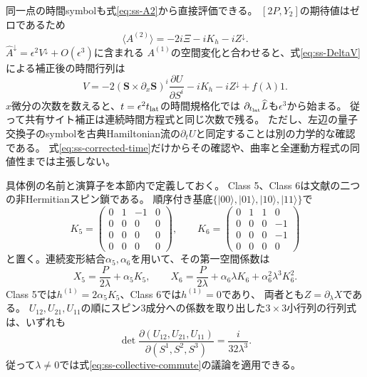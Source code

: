 同一点の時間symbolも式\eqref{eq:ss-A2}から直接評価できる。
$[2P,Y_2]$の期待値はゼロであるため
\begin{equation}
\langle A^{(2)}\rangle=-2i\Xi-iK_h-iZ^\downarrow.
\label{eq:ss-A2-symbol}
\end{equation}
$\widehat A^\downarrow=\epsilon^2V^\downarrow+O(\epsilon^3)$に含まれる
$A^{(1)}$の空間変化と合わせると、式\eqref{eq:ss-DeltaV}による補正後の時間行列は
\begin{equation}
V=-2(\boldsymbol S\times\partial_x\boldsymbol S)^i
        \frac{\partial U}{\partial S^i}
-iK_h-iZ^\downarrow+f(\lambda)1.
\label{eq:ss-corrected-time}
\end{equation}
$x$微分の次数を数えると、$t=\epsilon^2t_{\rm lat}$の時間規格化では
$\partial_{t_{\rm lat}}\widehat L$も$\epsilon^3$から始まる。
従って共有サイト補正は連続時間方程式と同じ次数で残る。
ただし、左辺の量子交換子のsymbolを古典Hamiltonian流の$\partial_tU$と同定することは別の力学的な確認である。
式\eqref{eq:ss-corrected-time}だけからその確認や、曲率と全運動方程式の同値性までは主張しない。

具体例の名前と演算子を本節内で定義しておく。
Class 5、Class 6は文献\cite{DPR2019,DFN2026}の二つの非Hermitianスピン鎖である。
順序付き基底$\{|00\rangle,|01\rangle,|10\rangle,|11\rangle\}$で
\begin{equation}
K_5=\begin{pmatrix}0&1&-1&0\\0&0&0&0\\0&0&0&0\\0&0&0&0\end{pmatrix},
\qquad
K_6=\begin{pmatrix}0&1&1&0\\0&0&0&-1\\0&0&0&-1\\0&0&0&0\end{pmatrix}
\label{eq:ss-model-K}
\end{equation}
と置く。連続変形結合$\alpha_5,\alpha_6$を用いて、その第一空間係数は
\begin{equation}
X_5=\frac{P}{2\lambda}+\alpha_5K_5,
\qquad
X_6=\frac{P}{2\lambda}+\alpha_6\lambda K_6+\alpha_6^2\lambda^3K_6^2.
\label{eq:ss-model-X}
\end{equation}
Class 5では$h^{(1)}=2\alpha_5K_5$、Class 6では$h^{(1)}=0$であり、
両者とも$Z=\partial_\lambda X$である。
$U_{12},U_{21},U_{11}$の順にスピン3成分への係数を取り出した$3\times3$小行列の行列式は、いずれも
\begin{equation}
\det\frac{\partial(U_{12},U_{21},U_{11})}{\partial(S^1,S^2,S^3)}
=\frac{i}{32\lambda^3}.
\label{eq:ss-model-rank}
\end{equation}
従って$\lambda\ne0$では式\eqref{eq:ss-collective-commute}の議論を適用できる。

